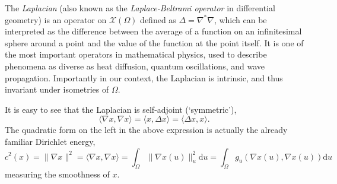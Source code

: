 The {\em Laplacian} (also known as the {\em Laplace-Beltrami operator} in differential geometry) is an operator on $\mathcal{X}(\Omega)$ defined as $\Delta = \nabla^* \nabla$,  
%
which can be interpreted 
as the difference between the average of a function on an
infinitesimal sphere around a point and the value of the
function at the point itself. 
%
%
It is one of the most important operators in mathematical physics, used to describe phenomena as diverse as heat diffusion, quantum oscillations,
and wave propagation.  
%
Importantly in our context, the Laplacian is intrinsic, and thus invariant under isometries of $\Omega$. 



It is easy to see that the Laplacian is self-adjoint (`symmetric'),
$$
\langle \nabla x, \nabla x \rangle = \langle x , \Delta x\rangle = \langle \Delta x ,  x\rangle.
$$
The quadratic form on the left in the above expression is actually the already familiar Dirichlet energy,  
$$c^2(x) = \| \nabla x \|^2 = \langle \nabla x, \nabla x \rangle = \int_\Omega \| \nabla x(u) \|_u^2 \mathrm{d}u = \int_\Omega g_u( \nabla x(u),  \nabla x(u)) \mathrm{d}u
$$
measuring the smoothness of $x$. 
%
%
%
%
%
%



